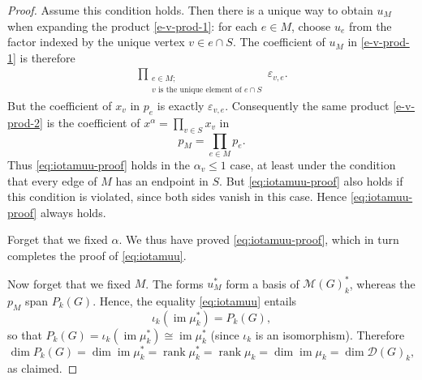\documentclass[12pt]{amsart}
\theoremstyle{definition}
\theoremstyle{remark}
\newcommand{\im}{\operatorname{im}}
\newcommand{\rank}{\operatorname{rank}}
\begin{document}
\begin{proof}
Assume this condition holds.  Then there is a unique way to obtain $u_M$
when expanding the product \eqref{e-v-prod-1}:
for each $e\in M$, choose $u_e$ from the factor
indexed by the unique vertex $v\in e\cap S$.  The coefficient of $u_M$
in \eqref{e-v-prod-1} is therefore
\begin{align}
 \label{e-v-prod-2}
 \prod_{\substack{e\in M;\\ v\text{ is the unique element of }e\cap S}}
 \varepsilon_{v,e}.
\end{align}
But the coefficient of $x_v$ in $p_e$ is exactly $\varepsilon_{v,e}$.
Consequently the same product \eqref{e-v-prod-2} is the coefficient of
$x^\alpha=\prod_{v\in S}x_v$ in
\[
 p_M=\prod_{e\in M}p_e.
\]
Thus \eqref{eq:iotamuu-proof} holds in the $\alpha_v \leq 1$ case,
at least under the condition that every edge
of $M$ has an endpoint in $S$. But \eqref{eq:iotamuu-proof}
also holds if this condition is violated, since both sides vanish
in this case. Hence \eqref{eq:iotamuu-proof} always holds.

Forget that we fixed $\alpha$. We thus have proved
\eqref{eq:iotamuu-proof}, which in turn completes
the proof of \eqref{eq:iotamuu}.

Now forget that we fixed $M$.
The forms $u_M^*$ form a basis of $\mathcal M(G)_k^*$,
whereas the $p_M$ span $P_k(G)$. Hence, the equality
\eqref{eq:iotamuu} entails
\[
 \iota_k(\im\mu_k^*) = P_k(G),
\]
so that $P_k(G) = \iota_k(\im\mu_k^*) \cong \im \mu_k^*$
(since $\iota_k$ is an isomorphism).
Therefore
\[
 \dim P_k(G)
 = \dim \im \mu_k^*
 =\rank\mu_k^*
 =\rank\mu_k
 =\dim\im\mu_k
 =\dim\mathcal D(G)_k,
\]
as claimed.
\end{proof}
\end{document}
